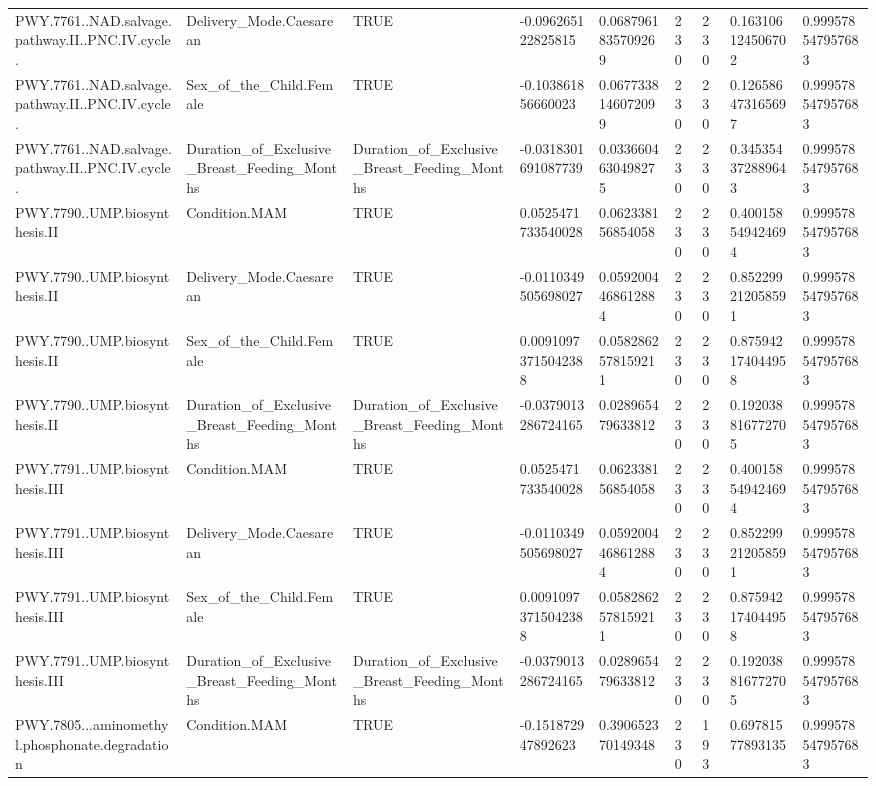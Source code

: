 \begin{longtable}{lllllllll}
PWY.7761..NAD.salvage.pathway.II..PNC.IV.cycle. & Delivery\_Mode.Caesarean & TRUE & -0.096265122825815 & 0.0687961835709269 & 230 & 230 & 0.163106124506702 & 0.999578547957683 \\
PWY.7761..NAD.salvage.pathway.II..PNC.IV.cycle. & Sex\_of\_the\_Child.Female & TRUE & -0.103861856660023 & 0.0677338146072099 & 230 & 230 & 0.126586473165697 & 0.999578547957683 \\
PWY.7761..NAD.salvage.pathway.II..PNC.IV.cycle. & Duration\_of\_Exclusive\_Breast\_Feeding\_Months & Duration\_of\_Exclusive\_Breast\_Feeding\_Months & -0.0318301691087739 & 0.0336604630498275 & 230 & 230 & 0.345354372889643 & 0.999578547957683 \\
PWY.7790..UMP.biosynthesis.II & Condition.MAM & TRUE & 0.0525471733540028 & 0.062338156854058 & 230 & 230 & 0.400158549424694 & 0.999578547957683 \\
PWY.7790..UMP.biosynthesis.II & Delivery\_Mode.Caesarean & TRUE & -0.0110349505698027 & 0.0592004468612884 & 230 & 230 & 0.852299212058591 & 0.999578547957683 \\
PWY.7790..UMP.biosynthesis.II & Sex\_of\_the\_Child.Female & TRUE & 0.00910973715042388 & 0.0582862578159211 & 230 & 230 & 0.875942174044958 & 0.999578547957683 \\
PWY.7790..UMP.biosynthesis.II & Duration\_of\_Exclusive\_Breast\_Feeding\_Months & Duration\_of\_Exclusive\_Breast\_Feeding\_Months & -0.0379013286724165 & 0.028965479633812 & 230 & 230 & 0.192038816772705 & 0.999578547957683 \\
PWY.7791..UMP.biosynthesis.III & Condition.MAM & TRUE & 0.0525471733540028 & 0.062338156854058 & 230 & 230 & 0.400158549424694 & 0.999578547957683 \\
PWY.7791..UMP.biosynthesis.III & Delivery\_Mode.Caesarean & TRUE & -0.0110349505698027 & 0.0592004468612884 & 230 & 230 & 0.852299212058591 & 0.999578547957683 \\
PWY.7791..UMP.biosynthesis.III & Sex\_of\_the\_Child.Female & TRUE & 0.00910973715042388 & 0.0582862578159211 & 230 & 230 & 0.875942174044958 & 0.999578547957683 \\
PWY.7791..UMP.biosynthesis.III & Duration\_of\_Exclusive\_Breast\_Feeding\_Months & Duration\_of\_Exclusive\_Breast\_Feeding\_Months & -0.0379013286724165 & 0.028965479633812 & 230 & 230 & 0.192038816772705 & 0.999578547957683 \\
PWY.7805...aminomethyl.phosphonate.degradation & Condition.MAM & TRUE & -0.151872947892623 & 0.390652370149348 & 230 & 193 & 0.69781577893135 & 0.999578547957683 \\

\end{longtable}
